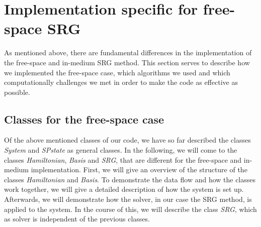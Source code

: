 \section{Implementation specific for free-space SRG}

As mentioned above, there are fundamental differences in the implementation of the free-space and in-medium SRG method. This section serves to describe how we implemented the free-space case, which algorithms we used and which computationally challenges  we met in order to make the code as effective as possible.

\subsection{Classes for the free-space case}
Of the above mentioned classes of our code, we have so far described the classes \textit{System} and \textit{SPstate} as general classes. In the following, we will come to the classes \textit{Hamiltonian}, \textit{Basis} and \textit{SRG}, that are different for the free-space and in-medium implementation. First, we will give an overview of the structure of the classes \textit{Hamiltonian} and \textit{Basis}. To demonstrate the data flow and how the classes work together, we will give a detailed description of how the system is set up. Afterwards, we will demonstrate how the solver, in our case the SRG method, is applied to the system. In the course of this, we will describe the class \textit{SRG}, which as solver is independent of the previous classes.

